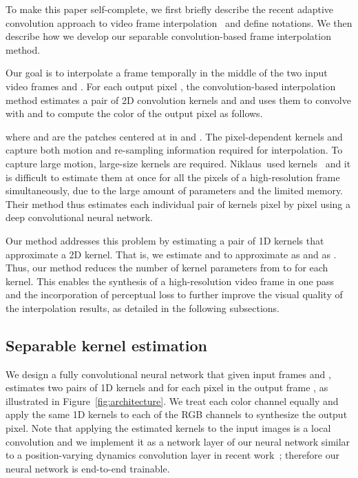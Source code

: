 \documentclass[10pt,twocolumn,letterpaper]{article}
\begin{document}
To make this paper self-complete, we first briefly describe the recent adaptive convolution approach to video frame interpolation~\cite{Niklaus_CVPR_2017} and define notations. We then describe how we develop our separable convolution-based frame interpolation method. 

Our goal is to interpolate a frame  temporally in the middle of the two input video frames  and . For each output pixel , the convolution-based interpolation method estimates a pair of 2D convolution kernels  and  and uses them to convolve with  and  to compute the color of the output pixel as follows.

where  and  are the patches centered at  in  and . The pixel-dependent kernels  and  capture both motion and re-sampling information required for interpolation. To capture large motion, large-size kernels are required. Niklaus~\etal used  kernels~\cite{Niklaus_CVPR_2017} and it is difficult to estimate them at once for all the pixels of a high-resolution frame simultaneously, due to the large amount of parameters and the limited memory. Their method thus estimates each individual pair of kernels pixel by pixel using a deep convolutional neural network.

Our method addresses this problem by estimating a pair of 1D kernels that approximate a 2D kernel. That is, we estimate  and  to approximate  as  and  as . Thus, our method reduces the number of kernel parameters from  to  for each kernel. This enables the synthesis of a high-resolution video frame in one pass and the incorporation of perceptual loss to further improve the visual quality of the interpolation results, as detailed in the following subsections. 

\subsection{Separable kernel estimation}

We design a fully convolutional neural network that given input frames  and , estimates two pairs of 1D kernels  and  for each pixel in the output frame , as illustrated in Figure~\ref{fig:architecture}. We treat each color channel equally and apply the same 1D kernels to each of the RGB channels to synthesize the output pixel. Note that applying the estimated kernels to the input images is a local convolution and we implement it as a network layer of our neural network similar to a position-varying dynamics convolution layer in recent work~\cite{Finn_NIPS_2016, Jia_NIPS_2016, Xue_NIPS_2016}; therefore our neural network is end-to-end trainable. 
\end{document}
